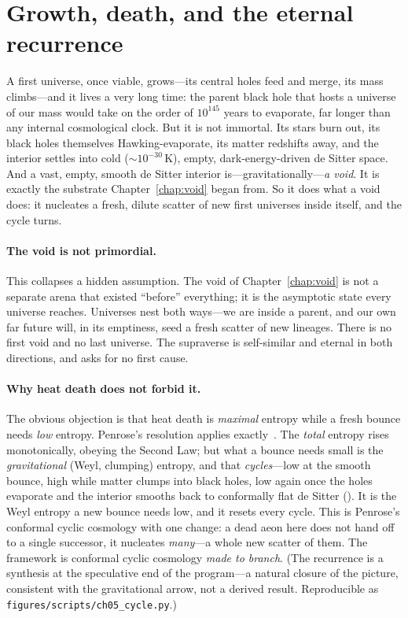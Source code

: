 \section{Growth, death, and the eternal recurrence}
\label{sec:recursive-cycle}

A first universe, once viable, grows---its central holes feed and merge, its mass
climbs---and it lives a very long time: the parent black hole that hosts a
universe of our mass would take on the order of $10^{145}$ years to evaporate, far
longer than any internal cosmological clock. But it is not immortal. Its stars
burn out, its black holes themselves Hawking-evaporate, its matter redshifts away,
and the interior settles into cold ($\sim10^{-30}\,\mathrm{K}$), empty,
dark-energy-driven de Sitter space. And a vast, empty, smooth de Sitter
interior is---gravitationally---\emph{a void}. It is exactly the substrate
Chapter~\ref{chap:void} began from. So it does what a void does: it nucleates a
fresh, dilute scatter of new first universes inside itself, and the cycle turns.

\paragraph{The void is not primordial.} This collapses a hidden assumption. The
void of Chapter~\ref{chap:void} is not a separate arena that existed ``before''
everything; it is the asymptotic state every universe reaches. Universes nest both
ways---we are inside a parent, and our own far future will, in its emptiness, seed
a fresh scatter of new lineages. There is no first void and no last universe. The supraverse
is self-similar and eternal in both directions, and asks for no first cause.

\paragraph{Why heat death does not forbid it.} The obvious objection is that heat
death is \emph{maximal} entropy while a fresh bounce needs \emph{low} entropy.
Penrose's resolution applies exactly~\citep{penrose2010}. The \emph{total} entropy
rises monotonically, obeying the Second Law; but what a bounce needs small is the
\emph{gravitational} (Weyl, clumping) entropy, and that \emph{cycles}---low at the
smooth bounce, high while matter clumps into black holes, low again once the holes
evaporate and the interior smooths back to conformally flat de Sitter
(). It is the Weyl entropy a new bounce needs low, and it resets
every cycle. This is Penrose's conformal cyclic cosmology with one change: a dead
aeon here does not hand off to a single successor, it nucleates \emph{many}---a
whole new scatter of them. The framework is conformal cyclic cosmology \emph{made to branch}. (The
recurrence is a synthesis at the speculative end of the program---a natural closure
of the picture, consistent with the gravitational arrow, not a derived result.
Reproducible as \texttt{figures/scripts/ch05\_cycle.py}.)

